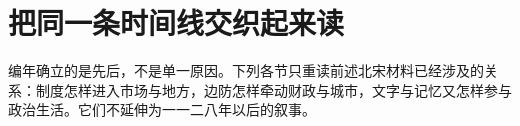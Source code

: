 \section{把同一条时间线交织起来读}

编年确立的是先后，不是单一原因。下列各节只重读前述北宋材料已经涉及的关系：制度怎样进入市场与地方，边防怎样牵动财政与城市，文字与记忆又怎样参与政治生活。它们不延伸为一一二八年以后的叙事。




